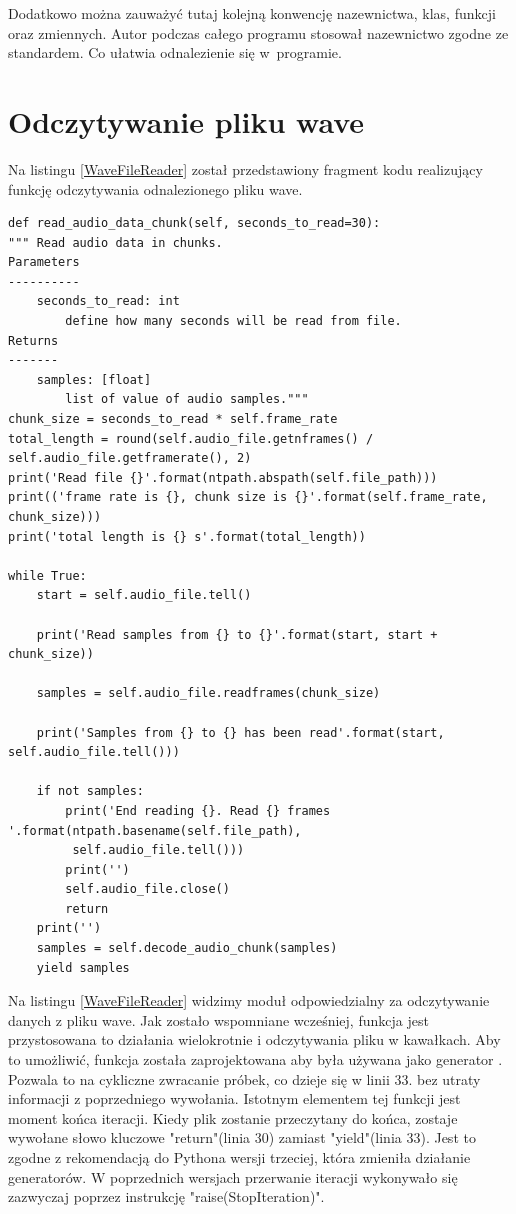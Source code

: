 \documentclass[eng,printmode]{mgr}
\begin{document}
Dodatkowo można zauważyć tutaj kolejną konwencję nazewnictwa, klas, funkcji oraz zmiennych. Autor podczas całego programu stosował nazewnictwo zgodne ze standardem\newline\cite{PEP8}. Co ułatwia odnalezienie się w~programie.


\section{Odczytywanie pliku wave}
Na listingu \ref{WaveFileReader} został przedstawiony fragment kodu realizujący funkcję odczytywania odnalezionego pliku wave. 
\begin{minipage}{\linewidth}
\begin{lstlisting}[caption={Fragment kodu źródłowego pliku WaveFileReader.py},captionpos=b,label={WaveFileReader}]
def read_audio_data_chunk(self, seconds_to_read=30):
""" Read audio data in chunks.
Parameters
----------
    seconds_to_read: int
        define how many seconds will be read from file.
Returns
-------
    samples: [float]
        list of value of audio samples."""
chunk_size = seconds_to_read * self.frame_rate
total_length = round(self.audio_file.getnframes() / self.audio_file.getframerate(), 2)
print('Read file {}'.format(ntpath.abspath(self.file_path)))
print(('frame rate is {}, chunk size is {}'.format(self.frame_rate, chunk_size)))
print('total length is {} s'.format(total_length))

while True:
    start = self.audio_file.tell()

    print('Read samples from {} to {}'.format(start, start + chunk_size))
                                             
    samples = self.audio_file.readframes(chunk_size)

    print('Samples from {} to {} has been read'.format(start, self.audio_file.tell()))

    if not samples:
        print('End reading {}. Read {} frames '.format(ntpath.basename(self.file_path),
         self.audio_file.tell()))
        print('')
        self.audio_file.close()
        return
    print('')
    samples = self.decode_audio_chunk(samples)
    yield samples
\end{lstlisting}
\end{minipage}
Na listingu \ref{WaveFileReader} widzimy moduł odpowiedzialny za odczytywanie danych z pliku wave. Jak zostało wspomniane wcześniej, funkcja jest przystosowana to działania wielokrotnie i odczytywania pliku w kawałkach. Aby to umożliwić, funkcja została zaprojektowana aby była używana jako generator \cite{Generator}. Pozwala to na cykliczne zwracanie próbek, co dzieje się w linii 33. bez utraty informacji z poprzedniego wywołania. Istotnym elementem tej funkcji jest moment końca iteracji. Kiedy plik zostanie przeczytany do końca, zostaje wywołane słowo kluczowe "return"(linia 30) zamiast "yield"(linia 33). Jest to zgodne z rekomendacją do Pythona wersji trzeciej, \cite{return} która zmieniła działanie generatorów. W poprzednich wersjach przerwanie iteracji wykonywało się zazwyczaj poprzez instrukcję "raise(StopIteration)". 
\end{document}
